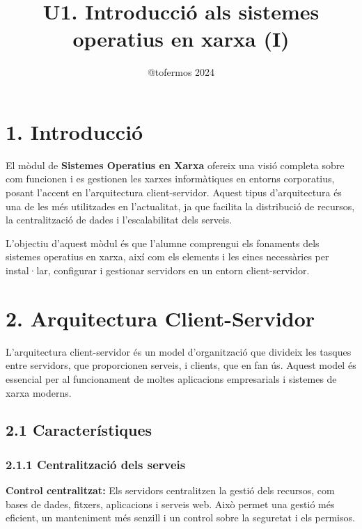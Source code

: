 \documentclass[
  a4paper,
]{article}
\title{U1. Introducció als sistemes operatius en xarxa (I)}
\author{@tofermos 2024}
\date{}
\begin{document}
\maketitle

{
\setcounter{tocdepth}{2}
\tableofcontents
}
\newpage
\renewcommand\tablename{Tabla}

\section{1. Introducció}\label{introducciuxf3}

El mòdul de \textbf{Sistemes Operatius en Xarxa} ofereix una visió
completa sobre com funcionen i es gestionen les xarxes informàtiques en
entorns corporatius, posant l'accent en l'arquitectura client-servidor.
Aquest tipus d'arquitectura és una de les més utilitzades en
l'actualitat, ja que facilita la distribució de recursos, la
centralització de dades i l'escalabilitat dels serveis.

L'objectiu d'aquest mòdul és que l'alumne comprengui els fonaments dels
sistemes operatius en xarxa, així com els elements i les eines
necessàries per instal·lar, configurar i gestionar servidors en un
entorn client-servidor.

\section{2. Arquitectura
Client-Servidor}\label{arquitectura-client-servidor}

L'arquitectura client-servidor és un model d'organització que divideix
les tasques entre servidors, que proporcionen serveis, i clients, que en
fan ús. Aquest model és essencial per al funcionament de moltes
aplicacions empresarials i sistemes de xarxa moderns.

\subsection{2.1 Característiques}\label{caracteruxedstiques}

\subsubsection{2.1.1 Centralització dels
serveis}\label{centralitzaciuxf3-dels-serveis}

\textbf{Control centralitzat:} Els servidors centralitzen la gestió dels
recursos, com bases de dades, fitxers, aplicacions i serveis web. Això
permet una gestió més eficient, un manteniment més senzill i un control
sobre la seguretat i els permisos.
\end{document}
